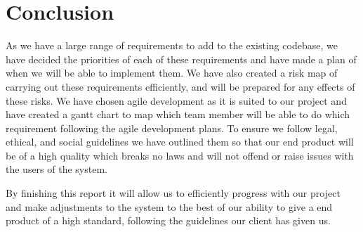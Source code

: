 \section{Conclusion}
As we have a large range of requirements to add to the existing codebase, we have decided the priorities of each of these requirements and have made a plan of when we will be able to implement them. We have also created a risk map of carrying out these requirements efficiently, and will be prepared for any effects of these risks. 
We have chosen agile development as it is suited to our project and have created a gantt chart to map which team member will be able to do which requirement following the agile development plans. 
To ensure we follow legal, ethical, and social guidelines we have outlined them so that our end product will be of a high quality which breaks no laws and will not offend or raise issues with the users of the system.

By finishing this report it will allow us to efficiently progress with our project and make adjustments to the system to the best of our ability to give a end product of a high standard, following the guidelines our client has given us.

  
